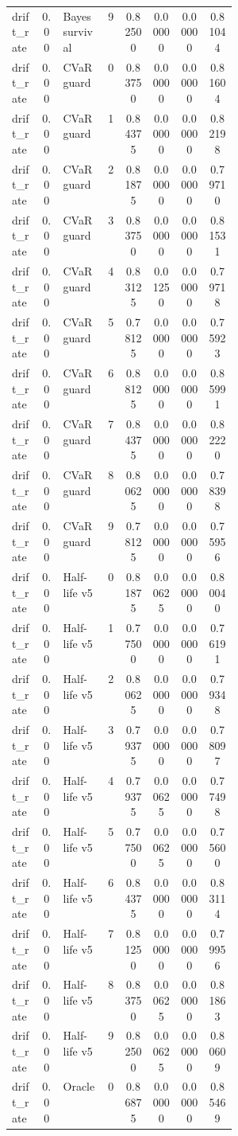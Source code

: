 \documentclass{article}
\begin{document}
\begin{center}
\begin{longtable}{p{0.13\linewidth}cp{0.20\linewidth}ccccc}
drift\_rate & 0.00 & Bayes survival & 9 & 0.82500 & 0.00000 & 0.00000 & 0.81044\\
drift\_rate & 0.00 & CVaR guard & 0 & 0.83750 & 0.00000 & 0.00000 & 0.81604\\
drift\_rate & 0.00 & CVaR guard & 1 & 0.84375 & 0.00000 & 0.00000 & 0.82198\\
drift\_rate & 0.00 & CVaR guard & 2 & 0.81875 & 0.00000 & 0.00000 & 0.79710\\
drift\_rate & 0.00 & CVaR guard & 3 & 0.83750 & 0.00000 & 0.00000 & 0.81531\\
drift\_rate & 0.00 & CVaR guard & 4 & 0.83125 & 0.01250 & 0.00000 & 0.79718\\
drift\_rate & 0.00 & CVaR guard & 5 & 0.78125 & 0.00000 & 0.00000 & 0.75923\\
drift\_rate & 0.00 & CVaR guard & 6 & 0.88125 & 0.00000 & 0.00000 & 0.85991\\
drift\_rate & 0.00 & CVaR guard & 7 & 0.84375 & 0.00000 & 0.00000 & 0.82220\\
drift\_rate & 0.00 & CVaR guard & 8 & 0.80625 & 0.00000 & 0.00000 & 0.78398\\
drift\_rate & 0.00 & CVaR guard & 9 & 0.78125 & 0.00000 & 0.00000 & 0.75956\\
drift\_rate & 0.00 & Half-life v5 & 0 & 0.81875 & 0.00625 & 0.00000 & 0.80040\\
drift\_rate & 0.00 & Half-life v5 & 1 & 0.77500 & 0.00000 & 0.00000 & 0.76191\\
drift\_rate & 0.00 & Half-life v5 & 2 & 0.80625 & 0.00000 & 0.00000 & 0.79348\\
drift\_rate & 0.00 & Half-life v5 & 3 & 0.79375 & 0.00000 & 0.00000 & 0.78097\\
drift\_rate & 0.00 & Half-life v5 & 4 & 0.79375 & 0.00625 & 0.00000 & 0.77498\\
drift\_rate & 0.00 & Half-life v5 & 5 & 0.77500 & 0.00625 & 0.00000 & 0.75600\\
drift\_rate & 0.00 & Half-life v5 & 6 & 0.84375 & 0.00000 & 0.00000 & 0.83114\\
drift\_rate & 0.00 & Half-life v5 & 7 & 0.81250 & 0.00000 & 0.00000 & 0.79956\\
drift\_rate & 0.00 & Half-life v5 & 8 & 0.83750 & 0.00625 & 0.00000 & 0.81863\\
drift\_rate & 0.00 & Half-life v5 & 9 & 0.82500 & 0.00625 & 0.00000 & 0.80609\\
drift\_rate & 0.00 & Oracle & 0 & 0.86875 & 0.00000 & 0.00000 & 0.85469\\

\end{longtable}
\end{center}
\end{document}
